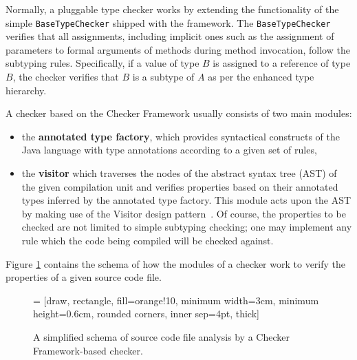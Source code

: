 \documentclass{pracamgr}
\theoremstyle{all}
\begin{document}
Normally, a pluggable type checker works by extending the
functionality of the simple \texttt{BaseTypeChecker} shipped with the
framework. The \texttt{BaseTypeChecker} verifies that all assignments,
including implicit ones such as the assignment of parameters to formal
arguments of methods during method invocation, follow the subtyping
rules. Specifically, if a value of type $B$ is assigned to a reference
of type $B$, the checker verifies that $B$ is a subtype of $A$ as per
the enhanced type hierarchy.

A checker based on the Checker Framework usually consists of two main
modules:
\begin{itemize}
\item the \textbf{annotated type factory}, which provides syntactical
  constructs of the Java language with type annotations according to a
  given set of rules,
\item the \textbf{visitor} which traverses the nodes of the abstract
  syntax tree (AST) of the given compilation unit and verifies
  properties based on their annotated types inferred by the annotated
  type factory. This module acts upon the AST by making use of the
  Visitor design pattern~\cite{visitor}. Of course, the properties to
  be checked are not limited to simple subtyping checking; one may
  implement any rule which the code being compiled will be checked
  against.
\end{itemize}
Figure \ref{fig:simple-checker} contains the schema of how the modules
of a checker work to verify the properties of a given source code
file.

\begin{figure}
  \centering

   = [draw, rectangle, fill=orange!10, minimum
  width=3cm, minimum height=0.6cm, rounded corners, inner sep=4pt, thick]

  \caption{A simplified schema of source code file analysis by a
    Checker Framework-based checker.}
  \label{fig:simple-checker}
\end{figure}
\end{document}
